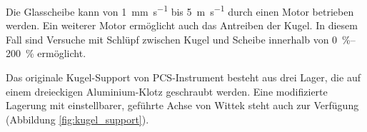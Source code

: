 Die Glasscheibe kann von \SI[per-mode=symbol]{1}{\milli\meter\per\second} bis \SI[per-mode=symbol]{5}{\meter\per\second} durch einen Motor betrieben werden.
Ein weiterer Motor ermöglicht auch das Antreiben der Kugel.
In diesem Fall sind Versuche mit Schlüpf zwischen Kugel und Scheibe innerhalb von \SIrange{0}{200}{\percent} ermöglicht.

Das originale Kugel-Support von PCS-Instrument besteht aus drei Lager, die auf einem dreieckigen Aluminium-Klotz geschraubt werden.
Eine modifizierte Lagerung mit einstellbarer, geführte Achse von Wittek \cite{wittek_2007} steht auch zur Verfügung (Abbildung \ref{fig:kugel_support}).
\begin{figure}[htb]
    \centering


\end{figure}
